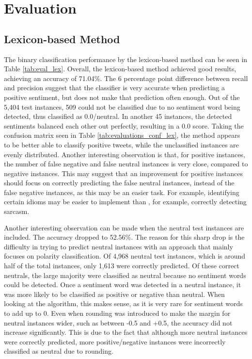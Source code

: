 \chapter{Evaluation}
\section{Lexicon-based Method}

The binary classification performance by the lexicon-based method can be seen in Table \ref{tab:eval_lex}. Overall, the lexicon-based method achieved good results, achieving an accuracy of 71.04\%. The 6 percentage point difference between recall and precision suggest that the classifier is very accurate when predicting a positive sentiment, but does not make that prediction often enough. Out of the 5,404 test instances, 509 could not be classified due to no sentiment word being detected, thus classified as 0.0/neutral. In another 45 instances, the detected sentiments balanced each other out perfectly, resulting in a 0.0 score. Taking the confusion matrix seen in Table \ref{tab:evaluations_conf_lex}, the method appears to be better able to classify positive tweets, while the unclassified instances are evenly distributed. Another interesting observation is that, for positive instances, the number of false negative and false neutral instances is very close, compared to negative instances. This may suggest that an improvement for positive instances should focus on correctly predicting the false neutral instances, instead of the false negative instances, as this may be an easier task. For example, identifying certain idioms may be easier to implement than , for example, correctly detecting sarcasm.

Another interesting observation can be made when the neutral test instances are included. The accuracy dropped to 52.56\%. The reason for this sharp drop is the difficulty in trying to predict neutral instances with an approach that mainly focuses on polarity classification. Of 4,968 neutral test instances, which is around half of the total instances, only 1,613 were correctly predicted. Of these correct neutrals, the large majority were classified as neutral because no sentiment words could be detected. Once a sentiment word was detected in a neutral instance, it was more likely to be classified as positive or negative than neutral. When looking at the algorithm, this makes sense, as it is very rare for sentiment words to add up to 0. Even when rounding was introduced to make the margin for neutral instances wider, such as between -0.5 and +0.5, the accuracy did not increase significantly. This is due to the fact that although more neutral instances were correctly predicted, more positive/negative instances were incorrectly classified as neutral due to rounding.

